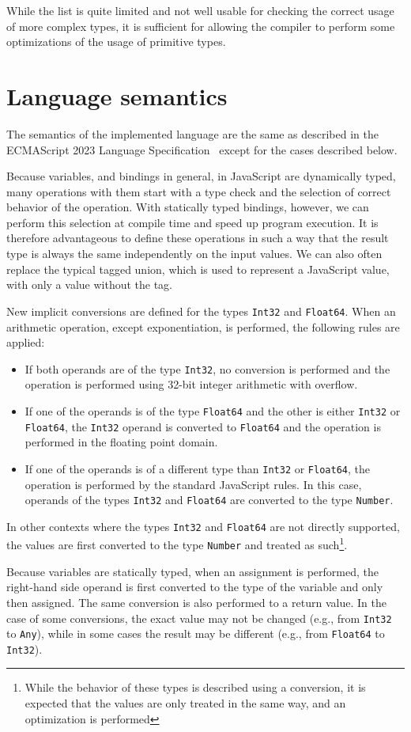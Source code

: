 While the list is quite limited and not well usable for checking the correct usage of more complex types, it is sufficient for allowing the compiler to perform some optimizations of the usage of primitive types.


\section{Language semantics}\label{lang:semantics}

The semantics of the implemented language are the same as described in the ECMAScript 2023 Language Specification~\cite{ecma262} except for the cases described below.

Because variables, and bindings in general, in JavaScript are dynamically typed, many operations with them start with a type check and the selection of correct behavior of the operation. With statically typed bindings, however, we can perform this selection at compile time and speed up program execution. It is therefore advantageous to define these operations in such a way that the result type is always the same independently on the input values. We can also often replace the typical tagged union, which is used to represent a JavaScript value, with only a value without the tag.

New implicit conversions are defined for the types \texttt{Int32} and \texttt{Float64}. When an arithmetic operation, except exponentiation, is performed, the following rules are applied:

\begin{itemize}
    \item If both operands are of the type \texttt{Int32}, no conversion is performed and the operation is performed using 32-bit integer arithmetic with overflow.
    \item If one of the operands is of the type \texttt{Float64} and the other is either \texttt{Int32} or \texttt{Float64}, the \texttt{Int32} operand is converted to \texttt{Float64} and the operation is performed in the floating point domain.
    \item If one of the operands is of a different type than \texttt{Int32} or \texttt{Float64}, the operation is performed by the standard JavaScript rules. In this case, operands of the types \texttt{Int32} and \texttt{Float64} are converted to the type \texttt{Number}.
\end{itemize}

In other contexts where the types \texttt{Int32} and \texttt{Float64} are not directly supported, the values are first converted to the type \texttt{Number} and treated as such\footnote{While the behavior of these types is described using a conversion, it is expected that the values are only treated in the same way, and an optimization is performed}.

Because variables are statically typed, when an assignment is performed, the right-hand side operand is first converted to the type of the variable and only then assigned. The same conversion is also performed to a return value. In the case of some conversions, the exact value may not be changed (e.g., from \texttt{Int32} to \texttt{Any}), while in some cases the result may be different (e.g., from \texttt{Float64} to \texttt{Int32}).
